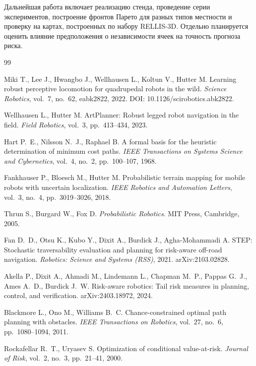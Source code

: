 \documentclass{misisarticle}
\begin{document}
Дальнейшая работа включает реализацию стенда, проведение серии экспериментов, построение фронтов Парето для разных типов местности и проверку на картах, построенных по набору RELLIS-3D. Отдельно планируется оценить влияние предположения о независимости ячеек на точность прогноза риска.

\begin{thebibliography}{99}

 Miki T., Lee J., Hwangbo J., Wellhausen L., Koltun V., Hutter M. Learning robust perceptive locomotion for quadrupedal robots in the wild. \textit{Science Robotics}, vol.~7, no.~62, eabk2822, 2022. DOI: 10.1126/scirobotics.abk2822.

 Wellhausen L., Hutter M. ArtPlanner: Robust legged robot navigation in the field. \textit{Field Robotics}, vol.~3, pp.~413--434, 2023.

 Hart P.~E., Nilsson N.~J., Raphael B. A formal basis for the heuristic determination of minimum cost paths. \textit{IEEE Transactions on Systems Science and Cybernetics}, vol.~4, no.~2, pp.~100--107, 1968.

 Fankhauser P., Bloesch M., Hutter M. Probabilistic terrain mapping for mobile robots with uncertain localization. \textit{IEEE Robotics and Automation Letters}, vol.~3, no.~4, pp.~3019--3026, 2018.

 Thrun S., Burgard W., Fox D. \textit{Probabilistic Robotics}. MIT Press, Cambridge, 2005.

 Fan D.~D., Otsu K., Kubo Y., Dixit A., Burdick J., Agha-Mohammadi A. STEP: Stochastic traversability evaluation and planning for risk-aware off-road navigation. \textit{Robotics: Science and Systems (RSS)}, 2021. arXiv:2103.02828.

 Akella P., Dixit A., Ahmadi M., Lindemann L., Chapman M.~P., Pappas G.~J., Ames A.~D., Burdick J.~W. Risk-aware robotics: Tail risk measures in planning, control, and verification. arXiv:2403.18972, 2024.

 Blackmore L., Ono M., Williams B.~C. Chance-constrained optimal path planning with obstacles. \textit{IEEE Transactions on Robotics}, vol.~27, no.~6, pp.~1080--1094, 2011.

 Rockafellar R.~T., Uryasev S. Optimization of conditional value-at-risk. \textit{Journal of Risk}, vol.~2, no.~3, pp.~21--41, 2000.


\end{thebibliography}
\end{document}
